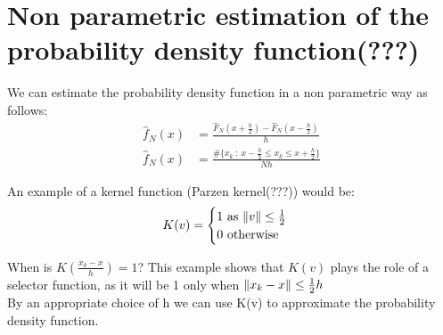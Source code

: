\chapter{Non parametric estimation of the probability density function(???)}

We can estimate the probability density function in a non parametric way as follows:
\begin{equation}
    \begin{aligned}
        \hat{f}_N(x) &= \frac{\hat{F}_N(x+\frac{h}{2}) - \hat{F}_N(x-\frac{h}{2})  }{h}\\
        \hat{f}_N(x) &= \frac{\#\{x_k\::\: x - \frac{h}{2}\le x_k \le x + \frac{h}{2}\}}{Nh}

        
    \end{aligned}
\end{equation}

{
    An example of a kernel function (Parzen kernel(???)) would be:
    \begin{equation}
        K(v) = \begin{cases}
            1 \text{ as } \lVert v\rVert \le \frac{1}{2}\\
            0 \text{ otherwise}
        \end{cases}
    \end{equation}


\begin{center}
\end{center}

    When is $K(\frac{x_k-x}{h}) = 1$? This example shows that $K(v)$ plays the role of a selector function, as it will be 1 only when $\lVert x_k-x\rVert \le \frac{1}{2}h$
    \\
    By an appropriate choice of h we can use K(v) to approximate the probability density function.
}

